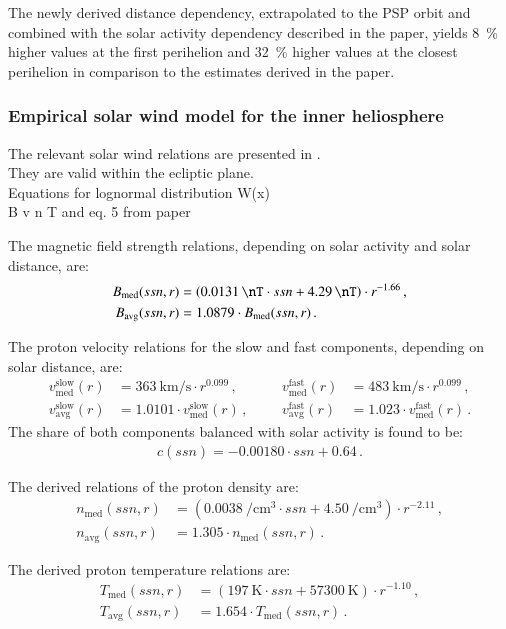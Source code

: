 The newly derived distance dependency, extrapolated to the PSP orbit and combined with the solar activity dependency described in the paper, yields \SI{8}{\%} higher values at the first perihelion and \SI{32}{\%} higher values at the closest perihelion in comparison to the estimates derived in the paper.\\


\subsubsection*{Empirical solar wind model for the inner heliosphere}

The relevant solar wind relations are presented in \citet[p.~10]{Venzmer2018}.\\
They are valid within the ecliptic plane.\\


Equations for lognormal distribution W(x)\\
B v n T and eq. 5 from paper\\
\begin{itemize*}
	\item The magnetic field strength relations, depending on solar activity and solar distance, are:
	\begin{align*}
		B_\text{med}(ssn,r) &= \left(\SI{0.0131}{\nT} \cdot ssn + \SI{4.29}{\nT}\right) \cdot r^{-1.66}	\,,\\
		B_\text{avg}(ssn,r) &= 1.0879 \cdot B_\text{med}(ssn,r)	\,.
	\end{align*}
	\item The proton velocity relations for the slow and fast components, depending on solar distance, are:
	\begin{align*}
		v_\text{med}^\text{slow}(r) &= \SI{363}{\km\per\s} \cdot r^{0.099}	\,,&    &       &v_\text{med}^\text{fast}(r) &= \SI{483}{\km\per\s} \cdot r^{0.099}	\,,\\
		v_\text{avg}^\text{slow}(r) &= 1.0101 \cdot v_\text{med}^\text{slow}(r)	\,,&    &       &v_\text{avg}^\text{fast}(r) &= 1.023 \cdot v_\text{med}^\text{fast}(r)	\,.
	\end{align*}
	The share of both components balanced with solar activity is found to be:
	\begin{align*}
		c(ssn) = -0.00180 \cdot ssn + 0.64	\,.
	\end{align*}
	\item The derived relations of the proton density are:
	\begin{align*}
		n_\text{med}(ssn,r) &= \left(\SI{0.0038}{\per\cm\cubed} \cdot ssn + \SI{4.50}{\per\cm\cubed}\right) \cdot r^{-2.11}	\,,\\
		n_\text{avg}(ssn,r) &= 1.305 \cdot n_\text{med}(ssn,r)	\,.
	\end{align*}
	\item The derived proton temperature relations are:
	\begin{align*}
		T_\text{med}(ssn,r) &= (\SI{197}{\K} \cdot ssn + \SI{57300}{\K}) \cdot r^{-1.10}	\,,\\
		T_\text{avg}(ssn,r) &= 1.654 \cdot T_\text{med}(ssn,r)\,.
	\end{align*}
\end{itemize*}

